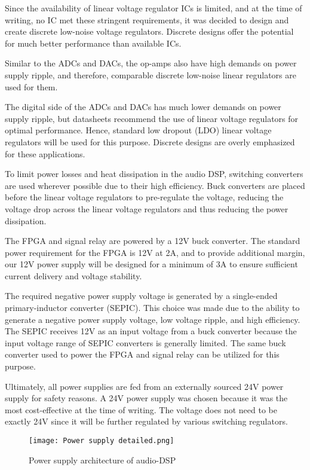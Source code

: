 Since the availability of linear voltage regulator ICs is limited, and at the time of writing, no IC met these stringent requirements, it was decided to design and create discrete low-noise voltage regulators. Discrete designs offer the potential for much better performance than available ICs.

Similar to the ADCs and DACs, the op-amps also have high demands on power supply ripple, and therefore, comparable discrete low-noise linear regulators are used for them.

The digital side of the ADCs and DACs has much lower demands on power supply ripple, but datasheets recommend the use of linear voltage regulators for optimal performance. Hence, standard low dropout (LDO) linear voltage regulators will be used for this purpose. Discrete designs are overly emphasized for these applications.

To limit power losses and heat dissipation in the audio DSP, switching converters are used wherever possible due to their high efficiency. Buck converters are placed before the linear voltage regulators to pre-regulate the voltage, reducing the voltage drop across the linear voltage regulators and thus reducing the power dissipation.

The FPGA and signal relay are powered by a 12V buck converter. The standard power requirement for the FPGA is 12V at 2A, and to provide additional margin, our 12V power supply will be designed for a minimum of 3A to ensure sufficient current delivery and voltage stability.

The required negative power supply voltage is generated by a single-ended primary-inductor converter (SEPIC). This choice was made due to the ability to generate a negative power supply voltage, low voltage ripple, and high efficiency. The SEPIC receives 12V as an input voltage from a buck converter because the input voltage range of SEPIC converters is generally limited. The same buck converter used to power the FPGA and signal relay can be utilized for this purpose.

Ultimately, all power supplies are fed from an externally sourced 24V power supply for safety reasons. A 24V power supply was chosen because it was the most cost-effective at the time of writing. The voltage does not need to be exactly 24V since it will be further regulated by various switching regulators.

\newpage

\begin{figure}[!h]
    \texttt{[image: Power supply detailed.png]}\\    
    \caption{Power supply architecture of audio-DSP}
    \label{fig:arch-power-supply}
\end{figure}

\par
